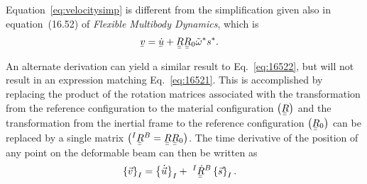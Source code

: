 \documentclass[a4paper]{article}
\newcommand{\ubar}[1]{\underaccent{\bar}{#1}}
\begin{document}
Equation~\eqref{eq:velocitysimp} is different from the simplification given also in equation~(16.52) of \textit{Flexible Multibody Dynamics}, which is
\begin{align}
  \ubar{v} &= \ubar{\dot{u}} + \ubar{\ubar{R}} \ubar{\ubar{R}}_{0} \tilde{\omega}^{*}s^{*}.
  \label{eq:16522}
\end{align}

An alternate derivation can yield a similar result to Eq.~\eqref{eq:16522}, but will not result in an expression matching Eq.~\eqref{eq:16521}.  This is accomplished by replacing the product of the rotation matrices associated with the transformation from the reference configuration to the material configuration $\left( \ubar{\ubar{R}} \right)$ and the transformation from the inertial frame to the reference configuration $\left( \ubar{\ubar{R}}_{0} \right)$ can be replaced by a single matrix $\left( ^{I}\ubar{\ubar{R}}^{B} = \ubar{\ubar{R}}\ubar{\ubar{R}}_{0} \right)$.  The time derivative of the position of any point on the deformable beam can then be written as
% 
\begin{align}
  \left\{ \vec{v} \right\}_{I} 
  &=  \left\{ \dot{ \vec{u}}\right\}_{I}
  + \  ^{I}\ubar{\ubar{\dot{R}}}^{B} \left\{ \vec{s} \right\}_{I}.
\end{align}
\end{document}
